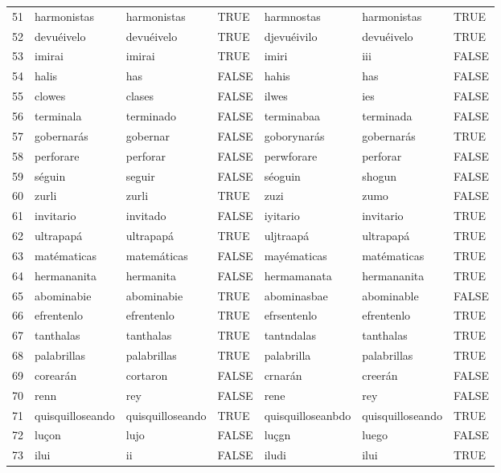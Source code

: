 \documentclass[paper=letter, fontsize=11pt]{scrartcl}
\numberwithin{equation}{section} %
\numberwithin{figure}{section} %
\numberwithin{table}{section} %
\begin{document}
\begin{table}[ht]
\centering
\begin{tabular}{rllllll}
  \hline
  51 & harmonistas & harmonistas & TRUE & harmnostas & harmonistas & TRUE \\ 
  52 & devuéivelo & devuéivelo & TRUE & djevuéivilo & devuéivelo & TRUE \\ 
  53 & imirai & imirai & TRUE & imiri & iii & FALSE \\ 
  54 & halis & has & FALSE & hahis & has & FALSE \\ 
  55 & clowes & clases & FALSE & ilwes & ies & FALSE \\ 
  56 & terminala & terminado & FALSE & terminabaa & terminada & FALSE \\ 
  57 & gobernarás & gobernar & FALSE & goborynarás & gobernarás & TRUE \\ 
  58 & perforare & perforar & FALSE & perwforare & perforar & FALSE \\ 
  59 & séguin & seguir & FALSE & séoguin & shogun & FALSE \\ 
  60 & zurli & zurli & TRUE & zuzi & zumo & FALSE \\ 
  61 & invitario & invitado & FALSE & iyitario & invitario & TRUE \\ 
  62 & ultrapapá & ultrapapá & TRUE & uljtraapá & ultrapapá & TRUE \\ 
  63 & matématicas & matemáticas & FALSE & mayématicas & matématicas & TRUE \\ 
  64 & hermananita & hermanita & FALSE & hermamanata & hermananita & TRUE \\ 
  65 & abominabie & abominabie & TRUE & abominasbae & abominable & FALSE \\ 
  66 & efrentenlo & efrentenlo & TRUE & efrsentenlo & efrentenlo & TRUE \\ 
  67 & tanthalas & tanthalas & TRUE & tantndalas & tanthalas & TRUE \\ 
  68 & palabrillas & palabrillas & TRUE & palabrilla & palabrillas & TRUE \\ 
  69 & corearán & cortaron & FALSE & crnarán & creerán & FALSE \\ 
  70 & renn & rey & FALSE & rene & rey & FALSE \\ 
  71 & quisquilloseando & quisquilloseando & TRUE & quisquilloseanbdo & quisquilloseando & TRUE \\ 
  72 & luçon & lujo & FALSE & luçgn & luego & FALSE \\ 
  73 & ilui & ii & FALSE & iludi & ilui & TRUE \\ 

\end{tabular}
\end{table}
\end{document}
